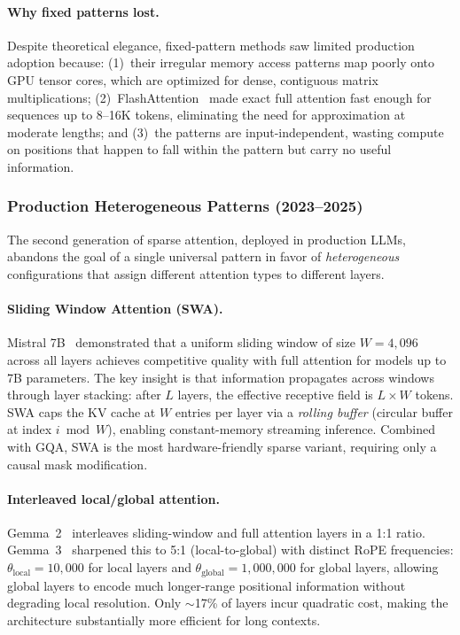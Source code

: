 \documentclass[11pt,a4paper]{article}
\begin{document}
\paragraph{Why fixed patterns lost.}
Despite theoretical elegance, fixed-pattern methods saw limited production adoption because: (1)~their irregular memory access patterns map poorly onto GPU tensor cores, which are optimized for dense, contiguous matrix multiplications; (2)~FlashAttention~\cite{dao2022flashattention} made exact full attention fast enough for sequences up to 8--16K tokens, eliminating the need for approximation at moderate lengths; and (3)~the patterns are input-independent, wasting compute on positions that happen to fall within the pattern but carry no useful information.

\subsubsection{Production Heterogeneous Patterns (2023--2025)}

The second generation of sparse attention, deployed in production LLMs, abandons the goal of a single universal pattern in favor of \emph{heterogeneous} configurations that assign different attention types to different layers.

\paragraph{Sliding Window Attention (SWA).}
Mistral 7B~\cite{jiang2023mistral} demonstrated that a uniform sliding window of size $W = 4{,}096$ across all layers achieves competitive quality with full attention for models up to 7B parameters. The key insight is that information propagates across windows through layer stacking: after $L$ layers, the effective receptive field is $L \times W$ tokens. SWA caps the KV cache at $W$ entries per layer via a \emph{rolling buffer} (circular buffer at index $i \bmod W$), enabling constant-memory streaming inference. Combined with GQA, SWA is the most hardware-friendly sparse variant, requiring only a causal mask modification.

\paragraph{Interleaved local/global attention.}
Gemma~2~\cite{gemma2024improving} interleaves sliding-window and full attention layers in a 1:1 ratio. Gemma~3~\cite{gemma2025gemma3} sharpened this to 5:1 (local-to-global) with distinct RoPE frequencies: $\theta_{\text{local}} = 10{,}000$ for local layers and $\theta_{\text{global}} = 1{,}000{,}000$ for global layers, allowing global layers to encode much longer-range positional information without degrading local resolution. Only ${\sim}$17\% of layers incur quadratic cost, making the architecture substantially more efficient for long contexts.
\end{document}
